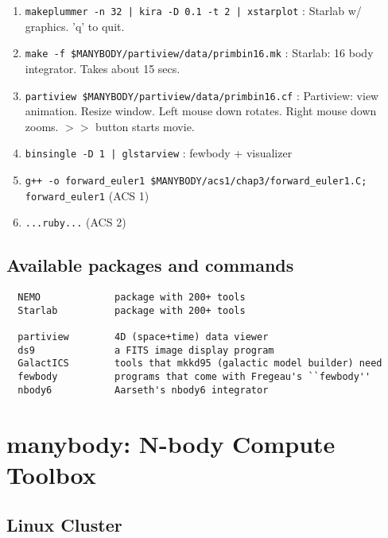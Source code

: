 \begin{itemize}
\begin{itemize}
\begin{enumerate}
\item
{\tt makeplummer -n 32 | kira -D 0.1 -t 2 | xstarplot} : Starlab w/ graphics. 'q' to quit.

\item
{\tt make -f \$MANYBODY/partiview/data/primbin16.mk} : Starlab: 16 body integrator. Takes about 15 secs.

\item
{\tt partiview  \$MANYBODY/partiview/data/primbin16.cf} : Partiview: view animation. Resize window.
Left mouse down rotates. Right mouse down zooms. $>>$ button starts movie.

\item
{\tt binsingle -D 1 | glstarview} : fewbody + visualizer

\item
{\tt g++ -o forward\_euler1 \$MANYBODY/acs1/chap3/forward\_euler1.C; forward\_euler1} 
(ACS 1)

\item
{\tt ...ruby...}
(ACS 2)


\end{enumerate}

\section{Available packages and commands}

\begin{verbatim}
  NEMO             package with 200+ tools
  Starlab          package with 200+ tools

  partiview        4D (space+time) data viewer
  ds9              a FITS image display program
  GalactICS        tools that mkkd95 (galactic model builder) need
  fewbody          programs that come with Fregeau's ``fewbody''
  nbody6           Aarseth's nbody6 integrator
\end{verbatim}


\chapter                {manybody: N-body Compute Toolbox}



\section{Linux Cluster}


\end{itemize}
\end{itemize}
